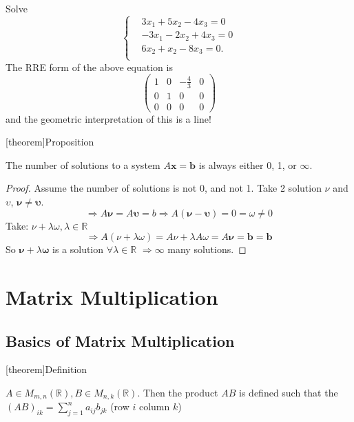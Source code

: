 \documentclass[12pt]{report}
\theoremstyle{definition}
\begin{document}
\begin{ex}
    Solve\[
        \left\{
            \begin{align*}
                & 3x_1 + 5x_2 - 4x_3 = 0 \\
                & -3x_1 - 2x_2 + 4x_3 = 0 \\
                & 6x_2 + x_2 - 8x_3 = 0. \\
            \end{align*}
            \right.
    \]
    The RRE form of the above equation is\[
        \begin{pmatrix}
            1 & 0 & -\frac{4}{3} & 0 \\
            0 & 1 & 0 & 0 \\
            0 & 0 & 0 & 0
        \end{pmatrix} 
    \]
    and the geometric interpretation of this is a line!
\end{ex}

[theorem]{Proposition}
\begin{Solutions to a system is 0, 1, infinity}
    The number of solutions to a system $A\pmb{x} = \pmb{b}$ is always either 0, 1, or $\infty$.
\end{Solutions to a system is 0, 1, infinity}

\begin{proof}
    Assume the number of solutions is not 0, and not 1.
    Take 2 solution $\nu$ and $\upsilon$, $\pmb{\nu} \neq \pmb{\upsilon}$.\[
        \Rightarrow{} A\pmb{\nu} = A\pmb{\upsilon} = b \Rightarrow{}
        A(\pmb{\nu} - \pmb{\upsilon}) = 0 = \omega \neq 0
    \]
    Take: $\nu + \lambda \omega, \lambda \in \mathbb{R}$\[
        \Rightarrow{} A(\nu + \lambda\omega) = A\nu + \lambda A\omega = A\pmb{\nu} = \pmb{b} = \pmb{b}
    \]
    So $\pmb{\nu} + \lambda \pmb{\omega}$ is a solution $\forall \lambda \in \mathbb{R}$
    $\Rightarrow{} \infty$ many solutions.
\end{proof}

\section{Matrix Multiplication}

\subsection{Basics of Matrix Multiplication}

[theorem]{Definition}
\begin{matrix multiplicatioin}
    $A \in M_{m, n}(\mathbb{R}), B \in M_{n, k}(\mathbb{R})$. Then the product $AB$
    is defined such that the ${(AB)}_{ik} = \sum_{j = 1}^{n} a_{ij}b_{jk}$ (row $i$ column $k$)
\end{matrix multiplicatioin}
\end{document}
